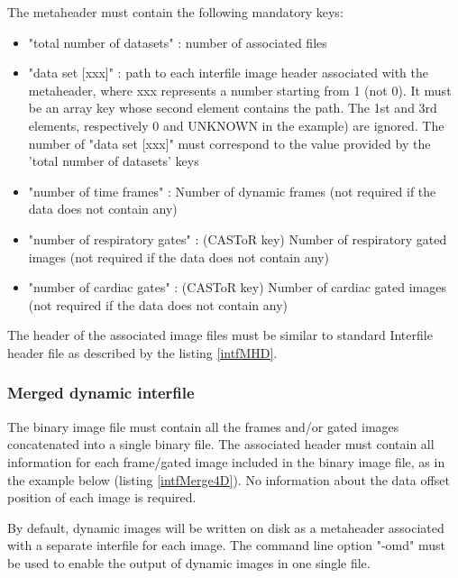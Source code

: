 \documentclass[a4paper, 11pt]{article}
\begin{document}
The metaheader must contain the following mandatory keys:

\begin{itemize}
  \item "total number of datasets" : number of associated files
  \item "data set [xxx]" : path to each interfile image header associated with the metaheader, where xxx represents a number
        starting from 1 (not 0). It must be an array key whose second element contains the path. The 1st and 3rd elements, respectively
        0 and UNKNOWN in the example) are ignored. The number of "data set [xxx]" must correspond to the value provided by the
        'total number of datasets' keys
  \item "number of time frames" : Number of dynamic frames (not required if the data does not contain any)
  \item "number of respiratory gates" : (CASToR key) Number of respiratory gated images (not required if the data does not contain any)
  \item "number of cardiac gates" : (CASToR key) Number of cardiac gated images (not required if the data does not contain any)
\end{itemize}

The header of the associated image files must be similar to standard Interfile header file as described by the listing \ref{intfMHD}.

\subsubsection{Merged dynamic interfile}
\label{sss_intf_dynamic_merged}

The binary image file must contain all the frames and/or gated images concatenated into a single binary file. The associated header must
contain all information for each frame/gated image included in the binary image file, as in the example below (listing \ref{intfMerge4D}). No
information about the data offset position of each image is required.

By default, dynamic images will be written on disk as a metaheader associated with a separate interfile for each image. The command line
option "-omd" must be used to enable the output of dynamic images in one single file.
\end{document}
